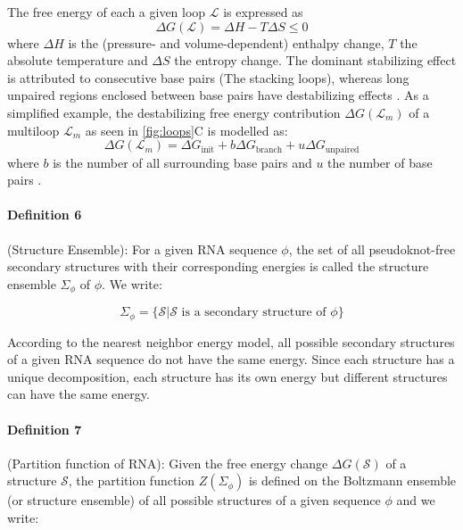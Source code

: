 The free energy of each a given loop $\mathcal{L}$ is expressed as
\begin{equation}\label{eq:gibbs}
\Delta G (\mathcal{L}) = \Delta H - T \Delta S \leq 0
\end{equation}
where $\Delta H$ is the (pressure- and volume-dependent) enthalpy change, $T$ the absolute temperature and $\Delta S$ the entropy change. 
The dominant stabilizing effect is attributed to consecutive base pairs (The stacking loops), whereas long unpaired regions enclosed between base pairs have destabilizing effects \cite{fresco_molecular_1960, hofacker_rna_2006}. As a simplified example, the destabilizing free energy contribution $\Delta G(\mathcal{L}_m)$ of a multiloop $\mathcal{L}_m$  as seen in \ref{fig:loops}C is modelled as:
\begin{equation}\label{eq:multi}
\Delta G(\mathcal{L}_m) = \Delta G_\mathrm{init} + b \Delta G_\mathrm{branch} + u \Delta G_\mathrm{unpaired}
\end{equation}
where $b$ is the number of all surrounding base pairs and $u$ the number of base pairs \parencite{dirks_partition_2003}.

\paragraph{\textbf{Definition 6}}  (Structure Ensemble):  For a given RNA sequence $\phi$,  the set of all pseudoknot-free secondary structures with their corresponding energies is called the structure ensemble $\Sigma_{\phi}$ of $\phi$.  We write: 

$$
\Sigma_{\phi} = \{ \mathcal{S} | \mathcal{S} \text{ is a secondary structure of $\phi$}\}
$$

According to the nearest neighbor energy model, all possible secondary structures of a given RNA sequence do not have the same energy. Since each structure has a unique decomposition, each structure has its own energy but different structures can have the same energy.

\paragraph{\textbf{Definition 7}} (Partition function of RNA): Given the free energy change $\Delta G(\mathcal{S})$ of a structure $\mathcal{S}$, the partition function $Z(\Sigma_{\phi})$ is defined on the Boltzmann ensemble (or structure ensemble) of all possible structures of a given sequence $\phi$ and we write: 

